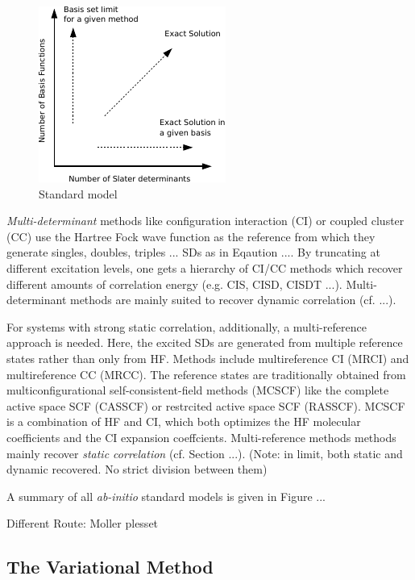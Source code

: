\begin{figure}
\centering
\includegraphics[scale=2.0]{Pics/standardmodel}
\caption{Standard model}
\end{figure}

\emph{Multi-determinant} methods like configuration interaction (CI) or coupled cluster (CC) use the Hartree Fock wave function as the reference from which they generate singles, doubles, triples ... SDs  as in Eqaution .... By truncating at different excitation levels, one gets a hierarchy of CI/CC methods which recover different amounts of correlation energy (e.g. CIS, CISD, CISDT ...). Multi-determinant methods are mainly suited to recover dynamic correlation (cf. ...).

For systems with strong static correlation, additionally, a multi-reference approach is needed. Here, the excited SDs are generated from multiple reference states rather than only from HF. Methods include multireference CI (MRCI) and multireference CC (MRCC). The reference states are traditionally obtained from multiconfigurational self-consistent-field methods (MCSCF) like the complete active space SCF (CASSCF) or restrcited active space SCF (RASSCF). MCSCF is a combination of HF and CI, which both optimizes the HF molecular coefficients and the CI expansion coeffcients. Multi-reference methods methods mainly recover \emph{static correlation} (cf. Section ...). (Note: in limit, both static and dynamic recovered. No strict division between them)

A summary of all \emph{ab-initio} standard models is given in Figure ...

Different Route: Moller plesset

\subsection{The Variational Method}

